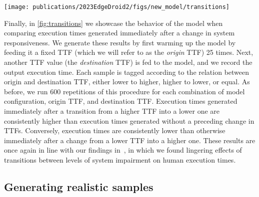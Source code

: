 \begin{figure*}
    \centering
    \texttt{[image: publications/2023EdgeDroid2/figs/new\_model/transitions]}
    \caption{%
        Effects of changes in system impairment on subsequently generated execution times.
        These effects linger on after the change, and thus execution times immediately after a transition are either consistently lower or higher than otherwise at the new \gls{TTF}, depending on the old \gls{TTF}.
        Error bars indicate \SI{95}{\percent} \gls{CI}.
    }\label{fig:transitions}
\end{figure*}

Finally, in \cref{fig:transitions} we showcase the behavior of the model when comparing execution times generated immediately after a change in system responsiveness.
We generate these results by first warming up the model by feeding it a fixed \gls{TTF} (which we will refer to as the \emph{origin} \gls{TTF}) \num{25} times.
Next, another \gls{TTF} value (the \emph{destination} \gls{TTF}) is fed to the model, and we record the output execution time.
Each sample is tagged according to the relation between origin and destination \gls{TTF}, either lower to higher, higher to lower, or equal.
As before, we run \num{600} repetitions of this procedure for each combination of model configuration, origin \gls{TTF}, and destination \gls{TTF}.
Execution times generated immediately after a transition from a higher \gls{TTF} into a lower one are consistently higher than execution times generated without a preceding change in \glspl{TTF}.
Conversely, execution times are consistently lower than otherwise immediately after a change from a lower \gls{TTF} into a higher one.
These results are once again in line with our findings in~\cite{olguinmunoz2021impact}, in which we found lingering effects of transitions between levels of system impairment on human execution times.


\subsection{Generating realistic samples}\label{ssec:model:frames}


